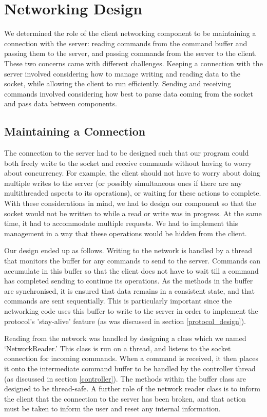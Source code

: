 \section{Networking Design}
\label{networking_design}

We determined the role of the client networking component to be maintaining a connection with the server: reading commands from the command buffer and passing them to the server, and passing commands from the server to the client. These two concerns came with different challenges. Keeping a connection with the server involved considering how to manage writing and reading data to the socket, while allowing the client to run efficiently. Sending and receiving commands involved considering how best to parse data coming from the socket and pass data between components.

\subsection {Maintaining a Connection}

The connection to the server had to be designed such that our program could both freely write to the socket and receive commands without having to worry about concurrency. For example, the client should not have to worry about doing multiple writes to the server (or possibly simultaneous ones if there are any multithreaded aspects to its operations), or waiting for these actions to complete. With these considerations in mind, we had to design our component so that the socket would not be written to while a read or write was in progress. At the same time, it had to accommodate multiple requests. We had to implement this management in a way that these operations would be hidden from the client.

Our design ended up as follows. Writing to the network is handled by a thread that monitors the buffer for any commands to send to the server. Commands can accumulate in this buffer so that the client does not have to wait till a command has completed sending to continue its operations. As the methods in the buffer are synchronised, it is ensured that data remains in a consistent state, and that commands are sent sequentially. This is particularly important since the networking code uses this buffer to write to the server in order to implement the protocol's 'stay-alive' feature (as was discussed in section \ref{protocol_design}).

Reading from the network was handled by designing a class which we named `NetworkReader.' This class is run on a thread, and listens to the socket connection for incoming commands. When a command is received, it then places it onto the intermediate command buffer to be handled by the controller thread (as discussed in section \ref{controller}). The methods within the buffer class are designed to be thread-safe. A further role of the network reader class is to inform the client that the connection to the server has been broken, and that action must be taken to inform the user and reset any internal information.

